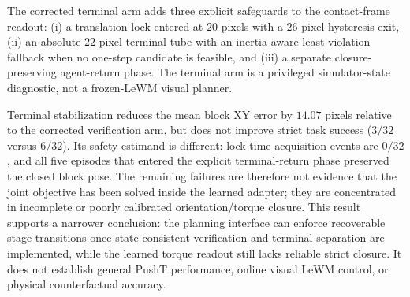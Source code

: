 \documentclass{article}
\begin{document}
The corrected terminal arm adds three explicit safeguards to the contact-frame
readout: (i) a translation lock entered at $20$ pixels with a $26$-pixel
hysteresis exit, (ii) an absolute $22$-pixel terminal tube with an
inertia-aware least-violation fallback when no one-step candidate is feasible,
and (iii) a separate closure-preserving agent-return phase.  The terminal arm
is a privileged simulator-state diagnostic, not a frozen-LeWM visual planner.

\begin{table}[H]
\centering
\scriptsize
\setlength{\tabcolsep}{3pt}
\caption{Corrected matched verification audit over two seeds and 32 paired
held-out cases.  The baseline is the same contact-frame top-eight verification
without terminal locking; the stabilized arm adds the lock, braking fallback,
and separate closure-preserving return.}
\label{tab:supp-verified-torque-closure}
\end{table}

Terminal stabilization reduces the mean block XY error by $14.07$ pixels
relative to the corrected verification arm, but does not improve strict task
success ($3/32$ versus $6/32$).  Its safety estimand is different: lock-time
acquisition events are $0/32$, and all five episodes that entered the explicit
terminal-return phase preserved the closed block pose.  The remaining failures
are therefore not evidence that the joint objective has been solved inside the
learned adapter; they are concentrated in incomplete or poorly calibrated
orientation/torque closure.  This result supports a narrower conclusion: the
planning interface can enforce recoverable stage transitions once state
consistent verification and terminal separation are implemented, while the
learned torque readout still lacks reliable strict closure.  It does not
establish general PushT performance, online visual LeWM control, or physical
counterfactual accuracy.
\end{document}
